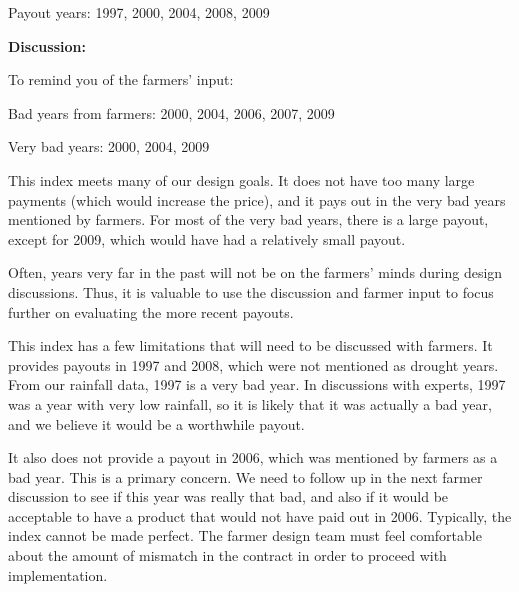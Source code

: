\documentclass[letterpaper,10pt,english]{sphinxmanual}
\begin{document}
{\hfill}

Payout years: 1997, 2000, 2004, 2008, 2009

\textbf{Discussion:}

To remind you of the farmers' input:

Bad years from farmers: 2000, 2004, 2006, 2007, 2009

Very bad years: 2000, 2004, 2009

This index meets many of our design goals. It does not have too many large payments (which would increase the price), and it pays out in the very bad years mentioned by farmers. For most of the very bad years, there is a large payout, except for 2009, which would have had a relatively small payout.

Often, years very far in the past will not be on the farmers' minds during design discussions. Thus, it is valuable to use the discussion and farmer input to focus further on evaluating the more recent payouts.

This index has a few limitations that will need to be discussed with farmers. It provides payouts in 1997 and 2008, which were not mentioned as drought years. From our rainfall data, 1997 is a very bad year. In discussions with experts, 1997 was a year with very low rainfall, so it is likely that it was actually a bad year, and we believe it would be a worthwhile payout.

It also does not provide a payout in 2006, which was mentioned by farmers as a bad year. This is a primary concern. We need to follow up in the next farmer discussion to see if this year was really that bad, and also if it would be acceptable to have a product that would not have paid out in 2006.  Typically, the index cannot be made perfect. The farmer design team must feel comfortable about the amount of mismatch in the contract in order to proceed with implementation.
\end{document}
